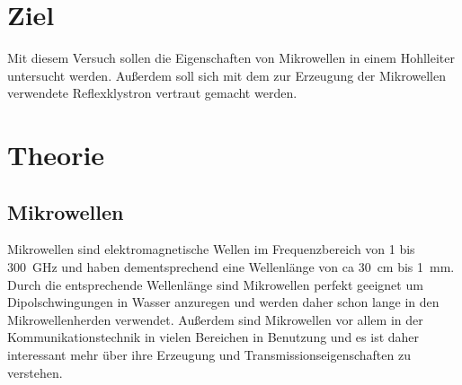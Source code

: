 \section*{Ziel}
    Mit diesem Versuch sollen die Eigenschaften von Mikrowellen in einem Hohlleiter untersucht werden.
    Außerdem soll sich mit dem zur Erzeugung der Mikrowellen verwendete Reflexklystron vertraut gemacht werden.
\section{Theorie}
    \label{sec:theorie}
    \subsection{Mikrowellen}
    \label{sec:mikrowellen}
        Mikrowellen sind elektromagnetische Wellen im Frequenzbereich von \num{1} bis \SI{300}{\giga\hertz} und haben dementsprechend eine Wellenlänge von ca \SI{30}{\centi\metre} bis \SI{1}{\milli\metre}.
        Durch die entsprechende Wellenlänge sind Mikrowellen perfekt geeignet um Dipolschwingungen in Wasser anzuregen und werden daher schon lange in den Mikrowellenherden verwendet.
        Außerdem sind Mikrowellen vor allem in der Kommunikationstechnik in vielen Bereichen in Benutzung und es ist daher interessant mehr über ihre Erzeugung und Transmissionseigenschaften zu verstehen.
